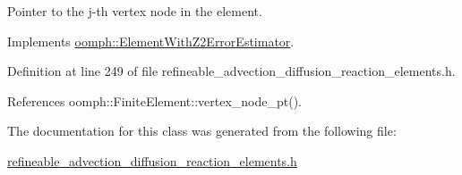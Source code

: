 Pointer to the j-\/th vertex node in the element. 



Implements \hyperlink{classoomph_1_1ElementWithZ2ErrorEstimator_a0eedccc33519f852c5dc2055ddf2774b}{oomph\+::\+Element\+With\+Z2\+Error\+Estimator}.



Definition at line 249 of file refineable\+\_\+advection\+\_\+diffusion\+\_\+reaction\+\_\+elements.\+h.



References oomph\+::\+Finite\+Element\+::vertex\+\_\+node\+\_\+pt().



The documentation for this class was generated from the following file\+:\begin{DoxyCompactItemize}
\item 
\hyperlink{refineable__advection__diffusion__reaction__elements_8h}{refineable\+\_\+advection\+\_\+diffusion\+\_\+reaction\+\_\+elements.\+h}\end{DoxyCompactItemize}
